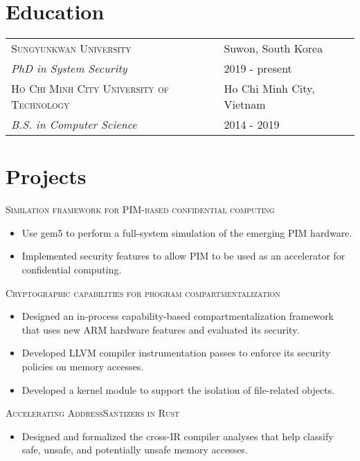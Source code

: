 \documentclass[a4paper,12pt]{article}
\begin{document}
\section{Education}
\begin{tabularx}{\linewidth}{@{}lX@{}}	
\textsc{Sungyunkwan University} & \hfill Suwon, South Korea\\
\emph{PhD in System Security} & \hfill  2019 - present   \\
\textsc{Ho Chi Minh City University of Technology} & \hfill Ho Chi Minh City, Vietnam\\
\emph{B.S. in Computer Science} & \hfill  2014 - 2019   \\
\end{tabularx}

\section{Projects}

\textsc{Similation framework for PIM-based confidential computing}
\begin{itemize}[nosep,after=\strut, leftmargin=2em, itemsep=3pt]
    \item Use gem5 to perform a full-system simulation of the emerging PIM hardware.
    \item Implemented security features to allow PIM to be used as an accelerator for confidential computing.
\end{itemize}

\textsc{Cryptographic capabilities for program compartmentalization}
\begin{itemize}[nosep,after=\strut, leftmargin=2em, itemsep=3pt]
    \item Designed an in-process capability-based compartmentalization framework that uses new ARM hardware features and evaluated its security.
    \item Developed LLVM compiler instrumentation passes to enforce its security policies on memory accesses.
    \item Developed a kernel module to support the isolation of file-related objects.
\end{itemize}

\textsc{Accelerating AddressSantizers in Rust}
\begin{itemize}[nosep,after=\strut, leftmargin=2em, itemsep=3pt]
    \item Designed and formalized the cross-IR compiler analyses that help classify safe, unsafe, and potentially unsafe memory accesses. 
\end{itemize}
\end{document}
